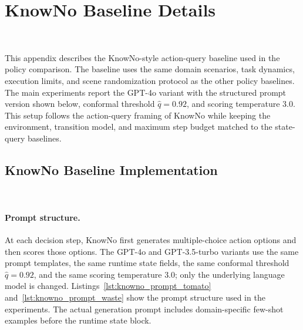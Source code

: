 \section{KnowNo Baseline Details}~\label{appx:exp}

This appendix describes the KnowNo-style action-query baseline used in the policy comparison. The baseline uses the same domain scenarios, task dynamics, execution limits, and scene randomization protocol as the other policy baselines. The main experiments report the GPT-4o variant with the structured prompt version shown below, conformal threshold $\hat{q}=0.92$, and scoring temperature $3.0$. This setup follows the action-query framing of KnowNo while keeping the environment, transition model, and maximum step budget matched to the state-query baselines.

\subsection{KnowNo Baseline Implementation}~\label{appx:knowno_impl}

\paragraph{Prompt structure.}
At each decision step, KnowNo first generates multiple-choice action options and then scores those options. The GPT-4o and GPT-3.5-turbo variants use the same prompt templates, the same runtime state fields, the same conformal threshold $\hat{q}=0.92$, and the same scoring temperature $3.0$; only the underlying language model is changed. Listings~\ref{lst:knowno_prompt_tomato} and~\ref{lst:knowno_prompt_waste} show the prompt structure used in the experiments. The actual generation prompt includes domain-specific few-shot examples before the runtime state block.

